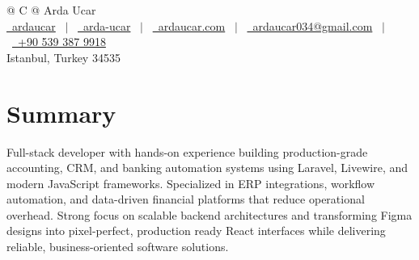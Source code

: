 \documentclass[a4paper,12pt]{article}
\begin{document}
\pagestyle{empty} 



\begin{tabularx}{\linewidth}{@{} C @{}}
\Huge{Arda Ucar} \\[7.5pt]
\href{https://github.com/ardaucar}{\raisebox{-0.05\height}\faGithub\ ardaucar} \ $|$ \ 
\href{https://www.linkedin.com/in/arda-ucar/}{\raisebox{-0.05\height}\faLinkedin\ arda-ucar} \ $|$ \ 
\href{https://ardaucar.com}{\raisebox{-0.05\height}\faGlobe \ ardaucar.com} \ $|$ \ 
\href{mailto:ardaucar034@gmail.com}{\raisebox{-0.05\height}\faEnvelope \ ardaucar034@gmail.com} \ $|$ \ 
\href{tel:+905393879918}{\raisebox{-0.05\height}\faMobile \ +90 539 387 9918} \\
{\small Istanbul, Turkey 34535}
\end{tabularx}


\section{Summary}
Full-stack developer with hands-on experience building production-grade accounting, CRM, and banking automation systems using Laravel, Livewire, and modern JavaScript frameworks. Specialized in ERP integrations, workflow automation, and data-driven financial platforms that reduce operational overhead. Strong focus on scalable backend architectures and transforming Figma designs into pixel-perfect, production ready React interfaces while delivering reliable, business-oriented software solutions.
\end{document}
